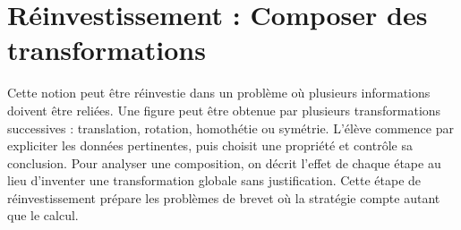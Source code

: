 \section{Réinvestissement : Composer des transformations}
Cette notion peut être réinvestie dans un problème où plusieurs informations doivent être reliées. Une figure peut être obtenue par plusieurs transformations successives : translation, rotation, homothétie ou symétrie. L’élève commence par expliciter les données pertinentes, puis choisit une propriété et contrôle sa conclusion. Pour analyser une composition, on décrit l’effet de chaque étape au lieu d’inventer une transformation globale sans justification. Cette étape de réinvestissement prépare les problèmes de brevet où la stratégie compte autant que le calcul.
